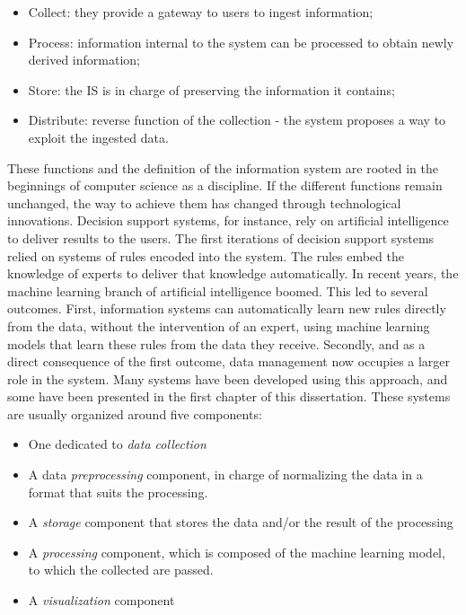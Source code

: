 \begin{itemize}
    \item Collect: they provide a gateway to users to ingest information;
    \item Process: information internal to the system can be processed to obtain newly derived information;
    \item Store: the IS is in charge of preserving the information it contains;
    \item Distribute: reverse function of the collection - the system proposes a way to exploit the ingested data.
\end{itemize}

These functions and the definition of the information system are rooted in the beginnings of computer science as a discipline.
If the different functions remain unchanged, the way to achieve them has changed through technological innovations.
Decision support systems, for instance, rely on artificial intelligence to deliver results to the users.
The first iterations of decision support systems relied on systems of rules encoded into the system.
The rules embed the knowledge of experts to deliver that knowledge automatically.
In recent years, the machine learning branch of artificial intelligence boomed.
This led to several outcomes.
First, information systems can automatically learn new rules directly from the data, without
the intervention of an expert, using machine learning models that learn these rules from the data they receive.
Secondly, and as a direct consequence of the first outcome, data management now occupies a larger role in the system.
Many systems have been developed using this approach, and some have been presented in the first chapter of this dissertation.
These systems are usually organized around five components:

\begin{itemize}
    \item One dedicated to \textit{data collection}
    \item A data \textit{preprocessing} component, in charge of normalizing the data in a format that suits the processing.
    \item A \textit{storage} component that stores the data and/or the result of the processing
    \item A \textit{processing} component, which is composed of the machine learning model, to which the collected are passed.
    \item A \textit{visualization} component
\end{itemize}

